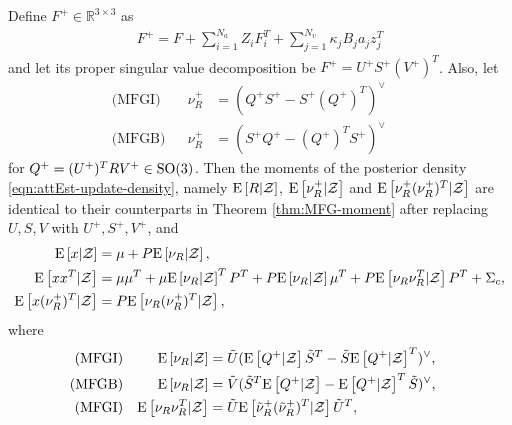 \begin{theorem} \label{thm:attEst-update-moments}
	Define  $F^+\in\mathbb{R}^{3\times 3}$ as
	\begin{align} \label{eqn:attEst-update-F}
		F^+ = F + \sum_{i=1}^{N_a}Z_iF_i^T + \sum_{j=1}^{N_v}\kappa_jB_ja_jz_j^T
	\end{align}
	and let its proper singular value decomposition be $F^+ = U^+ S^+ (V^+)^T$.
	Also, let
	\begin{subequations}
		\begin{flalign}
			\text{(MFGI)} && \nu^+_R &= (Q^+S^+-S^+(Q^+)^T)^\vee && \\
			\text{(MFGB)} && \nu^+_R &= (S^+Q^+-(Q^+)^TS^+)^\vee &&
		\end{flalign}
	\end{subequations}
	for $Q^+ = (U^+)^T R V^+\in\mathrm{SO}(3)$.
	Then the moments of the posterior density \eqref{eqn:attEst-update-density}, namely $\mathrm{E}\left[  R\lvert \mathcal{Z}  \right]$, $\mathrm{E}\left[  \nu^+_R\lvert \mathcal{Z}  \right]$ and $\mathrm{E}\left[  \nu^+_R(\nu^+_R)^T\lvert \mathcal{Z}  \right]$ are identical to their counterparts in Theorem \ref{thm:MFG-moment} after replacing $U,S,V$ with $U^+,S^+,V^+$, and
	\begin{align}
		\mathrm{E}\left[  x \lvert \mathcal{Z}  \right] & = {\mu}+P\mathrm{E}\left[  \nu_R \lvert \mathcal{Z}  \right], \label{eqn:attEst-update-Ex} \\
		\mathrm{E}\left[  xx^T \lvert \mathcal{Z}  \right] & = {\mu}{\mu}^T+{\mu}\mathrm{E}\left[  \nu_R \lvert \mathcal{Z}  \right]^TP^T+P\mathrm{E}\left[  \nu_R \lvert \mathcal{Z}  \right]{\mu}^T 
		+P\mathrm{E}\left[  \nu_R\nu_R^T \lvert \mathcal{Z}  \right]P^T+{\Sigma}_c,\\
		\mathrm{E}\left[  x(\nu^+_R)^T \lvert \mathcal{Z}  \right] & = P\mathrm{E}\left[  \nu_R(\nu^+_R)^T \lvert \mathcal{Z}  \right] \label{eqn:attEst-update-Exv'R},
	\end{align}
	where
	\begin{subequations}
		\renewcommand{\theparentequation}{\arabic{parentequation}}
		\begin{flalign} \label{eqn:attEst-update-EvR}
			\text{(MFGI)} && \expect{\nu_R|\mathcal{Z}} &= \tilde{U}(\expect{Q^+|\mathcal{Z}}\tilde{S}^T - \tilde{S}\expect{Q^+|\mathcal{Z}}^T)^\vee, && \\
			\text{(MFGB)} && \expect{\nu_R|\mathcal{Z} } &= \tilde{V}(\tilde{S}^T\expect{Q^+|\mathcal{Z}} - \expect{Q^+|\mathcal{Z}}^T\tilde{S})^\vee, && \\ \StepSubequations
			\text{(MFGI)} && \expect{\nu_R\nu_R^T|\mathcal{Z}} &= \tilde{U} \expect{\tilde{\nu}_R^+(\tilde{\nu}_R^+)^T|\mathcal{Z}} \tilde{U}^T, && \\

\end{flalign}
\end{subequations}
\end{theorem}
